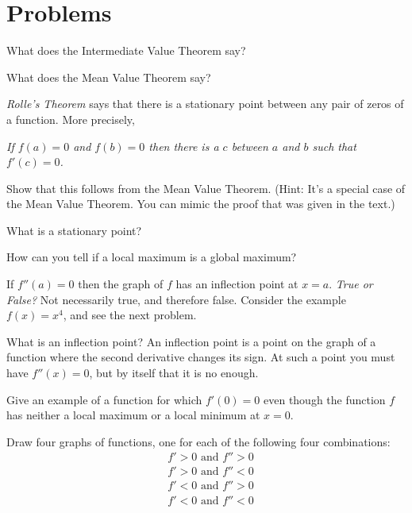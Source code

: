 \section{Problems} %
\problemfont %
\begin{multicols}{2}\setlength{\parindent}{0pt}




\problem What does the Intermediate Value Theorem say? %




\problem What does the Mean Value Theorem say? %

\problem  \textit{Rolle's Theorem} says that there is a stationary %
point between any pair of zeros of a function.  More precisely,
\begin{center}
  \rmfamily\itshape If $f(a) = 0$ and $f(b)=0$ then there is a $c$
  between $a$ and $b$ such that $f'(c) = 0$.
\end{center}
Show that this follows from the Mean Value Theorem. (Hint: It's a special case
of the Mean Value Theorem.  You can mimic the proof that was given in the text.)


\problem What is a stationary point? %




\problem \groupproblem How can you tell if a local maximum is a global %
maximum?




\problem \groupproblem If $f''(a) = 0$ then the graph of $f$ has an %
inflection point at $x=a$.  \emph{True or False?}
\answer %
Not necessarily true, and therefore false.  Consider the example
$f(x)=x^4$, and see the next problem.
\endanswer




\problem What is an inflection point? %
\answer %
An inflection point is a point on the graph of a function where the
second derivative changes its sign.  At such a point you must have
$f''(x) = 0$, but by itself that it is no enough.
\endanswer




\problem Give an example of a function for which $f'(0)=0$ even though the %
function $f$ has neither a local maximum or a local minimum at $x=0$.




\problem \groupproblem Draw four graphs of functions, one for each of %
the following four combinations:
\begin{align*}
  &f'>0\text{ and } f''>0 \\   &f'>0\text{ and } f''<0 \\
  &f'<0\text{ and } f''>0 \\   &f'<0\text{ and } f''<0 \\
\end{align*}


\end{multicols}
